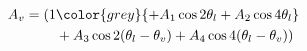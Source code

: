 \begin{align}
  A_v=(1&\color{grey}{+A_1\cos 2\theta_l + A_2\cos 4\theta_l } \\
        & +A_3\cos 2(\theta_l-\theta_v) + A_4\cos 4(\theta_l-\theta_v))
\end{align}
